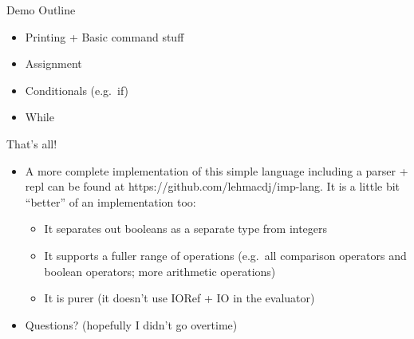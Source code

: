 \documentclass[pdf,t]{beamer}
\begin{document}
\begin{frame}{Demo Outline}
  \begin{itemize}
    \item Printing + Basic command stuff
    \item Assignment
    \item Conditionals (e.g.\ if)
    \item While
  \end{itemize}
\end{frame}

\begin{frame}{That's all!}
  \begin{itemize}
    \item<1-> A more complete implementation of this simple language including a
      parser + repl can be found at https://github.com/lehmacdj/imp-lang. It is
      a little bit ``better'' of an implementation too:
      \begin{itemize}
        \item It separates out booleans as a separate type from integers
        \item It supports a fuller range of operations (e.g.\ all comparison
          operators and boolean operators; more arithmetic operations)
        \item It is purer (it doesn't use IORef + IO in the evaluator)
      \end{itemize}
    \item<2-> Questions? (hopefully I didn't go overtime)
  \end{itemize}
\end{frame}
\end{document}
